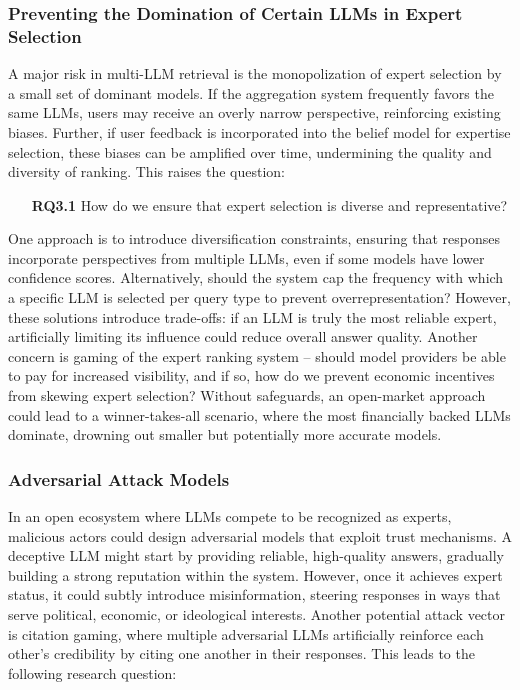 \subsubsection{Preventing the Domination of Certain LLMs in Expert Selection}
A major risk in multi-LLM retrieval is the monopolization of expert selection by a small set of dominant models. If the aggregation system frequently favors the same LLMs, users may receive an overly narrow perspective, reinforcing existing biases. Further, if user feedback is incorporated into the belief model for expertise selection, these biases can be amplified over time, undermining the quality and diversity of ranking. This raises the question: 

\begin{itemize}
    \item [\textbf{RQ3.1}] How do we ensure that expert selection is diverse and representative?
\end{itemize} 

One approach is to introduce diversification constraints, ensuring that responses incorporate perspectives from multiple LLMs, even if some models have lower confidence scores. Alternatively, should the system cap the frequency with which a specific LLM is selected per query type to prevent overrepresentation? However, these solutions introduce trade-offs: if an LLM is truly the most reliable expert, artificially limiting its influence could reduce overall answer quality. Another concern is gaming of the expert ranking system -- should model providers be able to pay for increased visibility, and if so, how do we prevent economic incentives from skewing expert selection? Without safeguards, an open-market approach could lead to a winner-takes-all scenario, where the most financially backed LLMs dominate, drowning out smaller but potentially more accurate models.

\subsubsection{Adversarial Attack Models}
In an open ecosystem where LLMs compete to be recognized as experts, malicious actors could design adversarial models that exploit trust mechanisms. 
%
A deceptive LLM might start by providing reliable, high-quality answers, gradually building a strong reputation within the system. However, once it achieves expert status, it could subtly introduce misinformation, steering responses in ways that serve political, economic, or ideological interests. Another potential attack vector is citation gaming, where multiple adversarial LLMs artificially reinforce each other's credibility by citing one another in their responses. This leads to the following research question:

